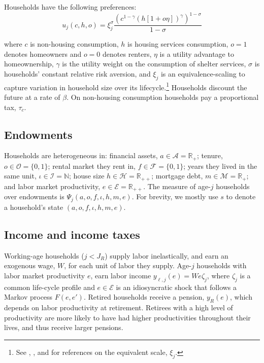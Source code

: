 \documentclass[parskip=full]{article}
\begin{document}
Households have the following preferences:
\begin{equation*}
    u_{j}(c,h,o)=\xi_{j}^{\sigma}\frac{\left(c^{1-\gamma} \left(h[1+o\eta]\right)^{\gamma}\right)^{1-\sigma}}{1-\sigma}
\end{equation*}


\noindent where $c$ is non-housing consumption, $h$ is housing services consumption, $o=1$ denotes homeowners and $o=0$ denotes renters, $\eta$ is a utility advantage to homeownership, $\gamma$ is the utility weight on the consumption of shelter services, $\sigma$ is households' constant relative risk aversion, and $\xi_{j}$ is an equivalence-scaling to capture variation in household size over its lifecycle.\footnote{See \citet{lm-1980}, \citet{wz-2010}, and \citet{xu-2013} for references on the equivalent scale, $\xi_{j}$.} Households discount the future at a rate of $\beta$. On non-housing consumption households pay a proportional tax, $\tau_{c}$.

\subsection{Endowments}

Households are heterogeneous in: financial assets, $a\in \mathcal{A}=\mathbb{R}_+$; tenure, $o \in \mathcal{O}=\{0,1\}$; rental market they rent in, $f \in \mathcal{F}=\{0,1\}$; years they lived in the same unit, $\iota \in \mathcal{I}=\mathbb{N}$; house size $h\in \mathcal{H}=\mathbb{R}_{++}$; mortgage debt, $m\in \mathcal{M}=\mathbb{R}_+$; and labor market productivity, $e \in\mathcal{E} = \mathbb{R}_{++}$. The measure of age-$j$ households over endowments is $\Psi_{j}(a,o,f,\iota,h,m,e)$. For brevity, we mostly use $s$ to denote a household's state $(a,o,f,\iota,h,m,e)$.

\subsection{Income and income taxes}\label{subsection:income}

Working-age households ($j<J_{R}$) supply labor inelastically, and earn an exogenous wage, $W$, for each unit of labor they supply. Age-$j$ households with labor market productivity $e$, earn labor income $y_{\ell,j}(e)=We\zeta_j$, where $\zeta_j$ is a common life-cycle profile and $e\in \mathcal{E}$ is an idiosyncratic shock that follows a Markov process $F(e,e')$. Retired households receive a pension, $y_{R}(e)$, which depends on labor productivity at retirement. Retirees with a high level of productivity are more likely to have had higher productivities throughout their lives, and thus receive larger pensions. 
\end{document}
